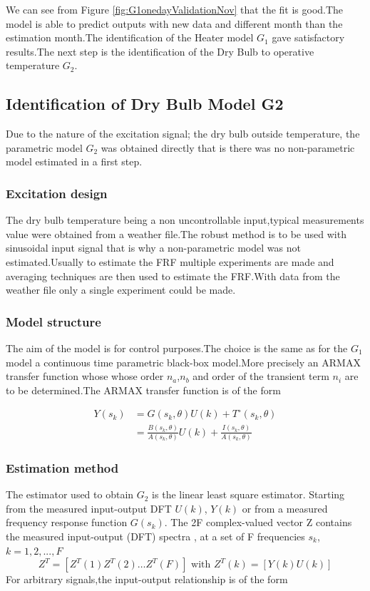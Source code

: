 \documentclass[a4paper,12pt]{article}
\numberwithin{equation}{section}
\begin{document}
\noindent
We can see from Figure \ref{fig:G1onedayValidationNov} that the fit is good.The model is able to predict outputs with new data and different month than the estimation month.The identification of the Heater model $G_{1}$ gave satisfactory results.The next step is the identification of the Dry Bulb to operative temperature $G_{2}$.

\subsection{Identification of Dry Bulb Model G2 }
Due to the nature of the excitation signal; the dry bulb outside temperature, the parametric model $G_{2}$ was obtained directly that is there was no non-parametric model estimated in a first step.

\subsubsection{Excitation design}
The dry bulb temperature being a non uncontrollable input,typical measurements value were obtained from a weather file.The robust method is to be used with sinusoidal input signal that is why a non-parametric model was not estimated.Usually to estimate the FRF multiple experiments are made and averaging techniques are then used to estimate the FRF.With data from the weather file only a single experiment could be made.

\subsubsection{Model structure}
The aim of the model is for control purposes.The choice is the same as for the $G_{1}$ model a continuous time parametric black-box model.More precisely an ARMAX transfer function whose whose order $n_{a}$,$n_{b}$ and order of the transient term $n_{i}$ are to be determined.The ARMAX transfer function  is of the form

\begin{equation}
\begin{aligned}
Y(s_{k}) &=G(s_{k}, \theta) U(k)+T^{\circ}(s_{k}, \theta) \\
&=\frac{B(s_{k}, \theta)}{A(s_{k}, \theta)} U(k)+\frac{I(s_{k}, \theta)}{A(s_{k}, \theta)}
\end{aligned}
\end{equation}

\subsubsection{Estimation method}
The estimator used to obtain $G_{2}$ is the linear least square estimator. Starting from the measured input-output DFT $U(k)$, $Y(k)$ or from a measured frequency response function $G(s_{k})$. The 2F complex-valued vector Z contains the measured
input-output (DFT) spectra , at a set of F frequencies $s_{k}$, $k = 1, 2, ...,F$
 $$
Z^{T}=\left[Z^{T}(1) Z^{T}(2) \ldots Z^{T}(F)\right] \text { with } Z^{T}(k)=[Y(k) U(k)]
$$
\noindent
 For arbitrary signals,the input-output relationship is of the form
\end{document}
